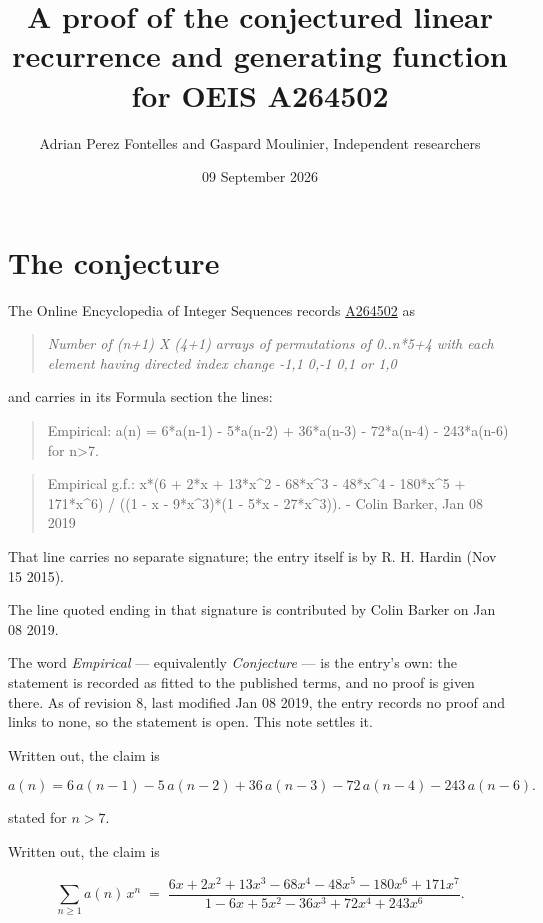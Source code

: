 \documentclass[11pt]{article}
\title{A proof of the conjectured linear recurrence and generating function for OEIS A264502}
\author{Adrian Perez Fontelles and Gaspard Moulinier, Independent researchers}
\date{09 September 2026}
\theoremstyle{definition}
\begin{document}
\maketitle
\section{The conjecture}

The Online Encyclopedia of Integer Sequences records \href{https://oeis.org/A264502}{A264502} as

\begin{quote}\itshape Number of (n+1) X (4+1) arrays of permutations of 0..n*5+4 with each element having directed index change -1,1 0,-1 0,1 or 1,0\end{quote}

and carries in its Formula section the lines:

\begin{quote}\ttfamily Empirical: a(n) = 6*a(n-1) - 5*a(n-2) + 36*a(n-3) - 72*a(n-4) - 243*a(n-6) for n>7.\end{quote}

\begin{quote}\ttfamily Empirical g.f.: x*(6 + 2*x + 13*x\textasciicircum{}2 - 68*x\textasciicircum{}3 - 48*x\textasciicircum{}4 - 180*x\textasciicircum{}5 + 171*x\textasciicircum{}6) / ((1 - x - 9*x\textasciicircum{}3)*(1 - 5*x - 27*x\textasciicircum{}3)). - Colin Barker, Jan 08 2019\end{quote}

That line carries no separate signature; the entry itself is by R. H. Hardin (Nov 15 2015).

The line quoted ending in that signature is contributed by Colin Barker on Jan 08 2019.

The word {\itshape Empirical} --- equivalently {\itshape Conjecture} --- is the entry's own: the statement is recorded as fitted to the published terms, and no proof is given there. As of revision 8, last modified Jan 08 2019, the entry records no proof and links to none, so the statement is open. This note settles it.

Written out, the claim is

\[a(n) = 6\,a(n-1) - 5\,a(n-2) + 36\,a(n-3) - 72\,a(n-4) - 243\,a(n-6).\]

stated for $n > 7$.

Written out, the claim is

\[\sum_{n \ge 1} a(n)\,x^n \;=\; \frac{6x + 2x^{2} + 13x^{3} - 68x^{4} - 48x^{5} - 180x^{6} + 171x^{7}}{1 - 6x + 5x^{2} - 36x^{3} + 72x^{4} + 243x^{6}}.\]
\end{document}

